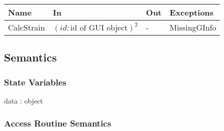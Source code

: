 \documentclass[12pt, titlepage]{article}
\begin{document}
\begin{center}
\begin{tabular}{p{3cm} p{4.5cm} p{3cm} p{3cm}}
\hline
\textbf{Name} & \textbf{In} & \textbf{Out} & \textbf{Exceptions} \\
\hline
CalcStrain & $(id:\text{id of GUI object})^{2}$  & - & MissingGInfo \\
\hline
\end{tabular}
\end{center}

\subsection{Semantics}

\subsubsection{State Variables}
data : object

\subsubsection{Access Routine Semantics}
\end{document}
